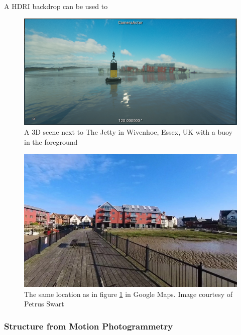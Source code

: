 \documentclass[12pt]{article}
\begin{document}
A HDRI backdrop can be used to 

\begin{figure}[h]
  \centering
  \begin{minipage}[b]{0.7\linewidth}
    \includegraphics[width=\linewidth]{images/wivenhoe-buoy.png}
    \caption{A 3D scene next to The Jetty in Wivenhoe, Essex, UK with a buoy in the foreground}
    \label{fig:wivenhoeBuoy}
  \end{minipage}
\end{figure}

\begin{figure}[h]
  \centering
  \begin{minipage}[b]{0.7\linewidth}
    \includegraphics[width=\linewidth]{images/wivenhoe-google-maps.png}
    \caption{The same location as in figure \ref{fig:wivenhoeBuoy} in Google Maps. Image courtesy of Petrus Swart}
    \label{fig:wivenhoeGoogleMaps}
  \end{minipage}
\end{figure}

\subsubsection{Structure from Motion Photogrammetry} \label{sec:sfm}
\end{document}
